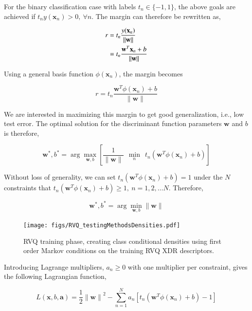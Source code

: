 \begin{Body}
For the binary classification case with labels $t_n \in \{-1, 1\}$, the above goals are achieved if $t_ny(\mathbf{x}_n)>0, \ \forall n$.  The margin can therefore be rewritten as,

\begin{align}
r &= t_n\frac{y(\mathbf{x}_n)}{{\|\mathbf{w}\|}}\\\notag
&=t_n\frac{\mathbf{w}^T\mathbf{x}_n+b}{\|\mathbf{w}\|}
\end{align}

Using a general basis function $\phi(\mathbf{x}_n)$, the margin becomes

\begin{equation}
r = t_n\frac{\mathbf{w}^T\phi(\mathbf{x}_n)+b}{\|\mathbf{w}\|}
\end{equation}

We are interested in maximizing this margin to get good generalization, i.e., low test error.  The optimal solution for the discriminant function parameters $\mathbf{w}$ and $b$ is therefore,

\begin{equation}
\mathbf{w}^*, b^* = \arg \max_{\mathbf{w},b} \left[\frac{1}{{\|\mathbf{w}\|}}\ \ \min_n \ \ t_n\left(\mathbf{w}^T\phi(\mathbf{x}_n)+b\right)\right]
\end{equation}

Without loss of generality, we can set $t_n\left(\mathbf{w}^T\phi(\mathbf{x}_n)+b\right) = 1$ under the $N$ constraints that $t_n\left(\mathbf{w}^T\phi(\mathbf{x}_n)+b\right) \geq 1, \ n=1, 2, \ldots N$.  Therefore,  

\begin{equation}
\mathbf{w}^*, b^* = \arg \min_{\mathbf{w},b} {\|\mathbf{w}\|}
\end{equation}

											\begin{figure}[t]
											\centering
											\texttt{[image: figs/RVQ\_testingMethodsDensities.pdf]}
											\caption{RVQ training phase, creating class conditional densities using first order Markov conditions on the training RVQ XDR descriptors.}
											\label{fig:RVQ_testingMethodsDensities}
											\end{figure}



Introducing Lagrange multipliers, $a_n \geq 0$ with one multiplier per constraint, gives the following Lagrangian function,

\begin{equation}
L(\mathbf{x}, b, \mathbf{a}) = \frac{1}{2}{\|\mathbf{w}\|}^2 - \sum\limits_{n=1}^N a_n \left[t_n\left(\mathbf{w}^T\phi(\mathbf{x}_n)+b\right)-1\right]
\label{Eqn:SVM_lagrange_function}
\end{equation}


\end{Body}
